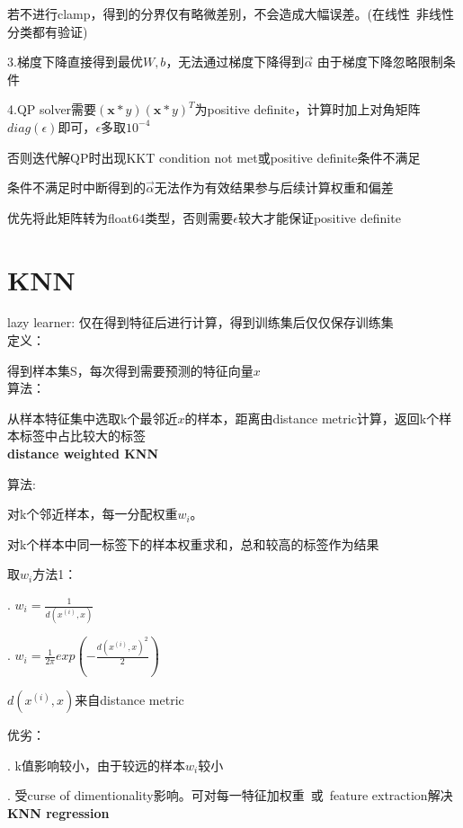 \documentclass[UTF8]{ctexart}
\begin{document}
  \quad \quad \quad 若不进行clamp，得到的分界仅有略微差别，不会造成大幅误差。(在线性\ 非线性分类都有验证)

  \quad \quad 3.梯度下降直接得到最优$W, b$，无法通过梯度下降得到$\vec{\alpha}$ 由于梯度下降忽略限制条件

  \quad \quad 4.QP solver需要$(\mathbf{x} * y)(\mathbf{x} * y)^T$为positive definite，计算时加上对角矩阵$diag(\epsilon)$即可，$\epsilon$多取$10^{-4}$

  \quad \quad \quad 否则迭代解QP时出现KKT condition not met或positive definite条件不满足

  \quad \quad \quad 条件不满足时中断得到的$\vec{\alpha}$无法作为有效结果参与后续计算权重和偏差

  \quad \quad \quad 优先将此矩阵转为float64类型，否则需要$\epsilon$较大才能保证positive definite
  
\section{KNN}
\noindent lazy learner: 仅在得到特征后进行计算，得到训练集后仅仅保存训练集\\
  定义：

  \quad 得到样本集S，每次得到需要预测的特征向量$x$\\
  算法：

  \quad 从样本特征集中选取k个最邻近$x$的样本，距离由distance metric计算，返回k个样本标签中占比较大的标签\\
\textbf{distance weighted KNN}

  算法:

  \quad 对k个邻近样本，每一分配权重$w_i$。

  \quad 对k个样本中同一标签下的样本权重求和，总和较高的标签作为结果

  取$w_i$方法1：

  . $w_i = \frac{1}{d(x^{(i)}, x)}$

  . $w_i = \frac{1}{2\pi} exp(-\frac{d(x^{(i)}, x)^2}{2})$

  \quad $d(x^{(i)}, x)$来自distance metric

  优劣：

  . k值影响较小，由于较远的样本$w_i$较小

  . 受curse of dimentionality影响。可对每一特征加权重\ 或\ feature extraction解决\\
\textbf{KNN regression}
\end{document}
